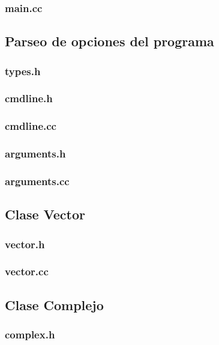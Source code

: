 \documentclass{article}
\begin{document}
    \subsubsection{main.cc}
      
  \subsection{Parseo de opciones del programa}
    \subsubsection{types.h}
      
    \subsubsection{cmdline.h}
      
    \subsubsection{cmdline.cc}
      
    \subsubsection{arguments.h}
      
    \subsubsection{arguments.cc}
      
  \subsection{Clase Vector}
    \subsubsection{vector.h}
      
    \subsubsection{vector.cc}
      
  \subsection{Clase Complejo}
    \subsubsection{complex.h}
      
\end{document}
